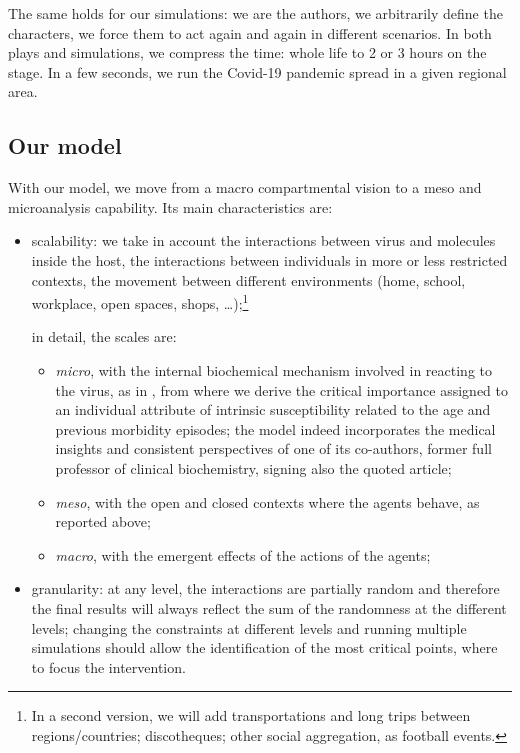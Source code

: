 \documentclass[11pt]{article}
\begin{document}
The same holds for our simulations: we are the authors, we arbitrarily define the characters, we force them to act again and again in different scenarios. In both plays and simulations, we compress the time: whole life to 2 or 3 hours on the stage. In a few seconds, we run the Covid-19 pandemic spread in a given regional area.

\subsection{Our model}

With our model, we move from a macro compartmental vision to a meso and microanalysis capability. Its main characteristics are:

\begin{itemize}

\item
scalability: we take in account the interactions between virus and molecules inside the host, the interactions between individuals in more or less restricted contexts, the movement between different environments (home, school, workplace, open spaces, shops, \ldots);\footnote{In a second version, we will add transportations and long trips between regions/countries; discotheques; other social aggregation, as football events.}

in detail, the scales are: 

\begin{itemize}
\setlength\itemsep{0.3em}
\item
	\emph{micro}, with the internal biochemical mechanism involved in reacting to the virus, as in \cite{Silvagno_2020}, from where we derive the critical importance assigned to an individual attribute of intrinsic susceptibility related to the age and previous morbidity episodes; the model indeed incorporates the medical insights and consistent perspectives of one of its co-authors, former full professor of clinical biochemistry, signing also the quoted article;
\item
	\emph{meso}, with the open and closed contexts where the agents behave, as reported above;
\item	
	\emph{macro}, with the emergent effects of the actions of the agents;
	
\end{itemize}

\item
granularity: at any level, the interactions are partially random and therefore the final results will always reflect the sum of the randomness at the different levels; changing the constraints at different levels and running multiple simulations should allow the identification of the most critical points, where to focus the intervention.

\end{itemize}
\end{document}
